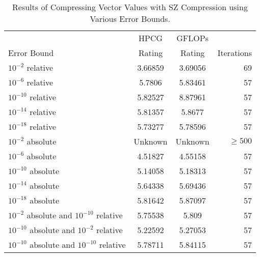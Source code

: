 \begin{table}
	\centering
	\begin{tabular}{l|S[table-format=2.6]|S[table-format=2.6]|r}
		            & {HPCG}   & {GFLOPs} &            \\
		Error Bound & {Rating} & {Rating} & Iterations \\
		\hline
		\(10^{-2}\) relative & 3.66859 & 3.69056 & 69 \\
		\(10^{-6}\) relative & 5.7806 & 5.83461 & 57 \\
		\(10^{-10}\) relative & 5.82527 & 8.87961 & 57 \\
		\(10^{-14}\) relative & 5.81357 & 5.8677 & 57 \\
		\(10^{-18}\) relative & 5.73277 & 5.78596 & 57 \\
		\(10^{-2}\) absolute & {Unknown} & {Unknown} & \(\geq 500\) \\
		\(10^{-6}\) absolute & 4.51827 & 4.55158 & 57 \\
		\(10^{-10}\) absolute & 5.14058 & 5.18313 & 57\\
		\(10^{-14}\) absolute & 5.64338 & 5.69436 & 57 \\
		\(10^{-18}\) absolute & 5.81642 & 5.87097 & 57 \\
		\(10^{-2}\) absolute and \(10^{-10}\) relative & 5.75538 & 5.809 & 57 \\
		\(10^{-10}\) absolute and \(10^{-2}\) relative & 5.22592 & 5.27053 & 57 \\
		\(10^{-10}\) absolute and \(10^{-10}\) relative & 5.78711 & 5.84115 & 57 \\
	\end{tabular}
	\caption{Results of Compressing Vector Values with SZ Compression using Various Error Bounds.}
	\label{tab:results-vec-SZ}
\end{table}